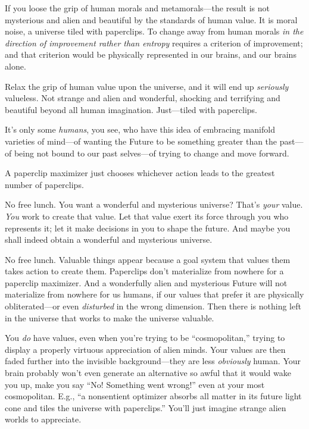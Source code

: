 {
 If you loose the grip of human morals and metamorals---the result
is not mysterious and alien and beautiful by the standards of human
value. It is moral noise, a universe tiled with paperclips. To change
away from human morals \textit{in the direction of improvement rather
than entropy} requires a criterion of improvement; and that criterion
would be physically represented in our brains, and our brains alone.}

{
 Relax the grip of human value upon the universe, and it will end
up \textit{seriously} valueless. Not strange and alien and wonderful,
shocking and terrifying and beautiful beyond all human imagination.
Just---tiled with paperclips.}

{
 It's only some \textit{humans}, you see, who have
this idea of embracing manifold varieties of mind---of wanting the
Future to be something greater than the past---of being not bound to
our past selves---of trying to change and move forward.}

{
 A paperclip maximizer just chooses whichever action leads to the
greatest number of paperclips.}

{
 No free lunch. You want a wonderful and mysterious universe?
That's \textit{your} value. \textit{You} work to create
that value. Let that value exert its force through you who represents
it; let it make decisions in you to shape the future. And maybe you
shall indeed obtain a wonderful and mysterious universe.}

{
 No free lunch. Valuable things appear because a goal system that
values them takes action to create them. Paperclips
don't materialize from nowhere for a paperclip
maximizer. And a wonderfully alien and mysterious Future will not
materialize from nowhere for us humans, if our values that prefer it
are physically obliterated---or even \textit{disturbed} in the wrong
dimension. Then there is nothing left in the universe that works to
make the universe valuable.}

{
 You \textit{do} have values, even when you're
trying to be ``cosmopolitan,''
trying to display a properly virtuous appreciation of alien minds. Your
values are then faded further into the invisible background{}---they
are less \textit{obviously} human. Your brain probably
won't even generate an alternative so awful that it
would wake you up, make you say ``No! Something went
wrong!'' even at your most cosmopolitan. E.g.,
``a nonsentient optimizer absorbs all matter in its
future light cone and tiles the universe with
paperclips.'' You'll just imagine
strange alien worlds to appreciate.}

